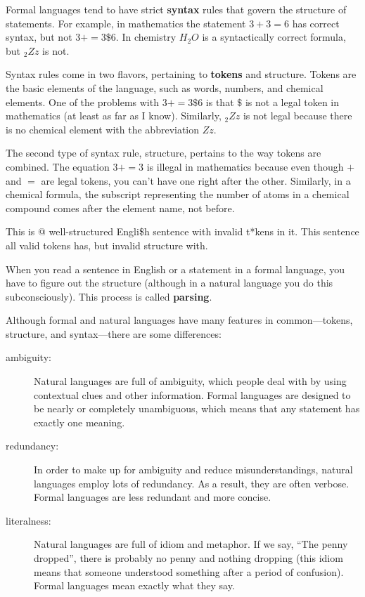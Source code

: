 Formal languages tend to have strict {\bf syntax} rules that
govern the structure of statements.
For example, in mathematics the statement
$3 + 3 = 6$ has correct syntax, but
not $3 + = 3 \$ 6$.  In chemistry
$H_2O$ is a syntactically correct formula, but $_2Zz$ is not.

Syntax rules come in two flavors, pertaining to {\bf tokens} and
structure.  Tokens are the basic elements of the language, such as
words, numbers, and chemical elements.  One of the problems with
$3 += 3 \$ 6$ is that \( \$ \) is not a legal token in mathematics
(at least as far as I know).  Similarly, $_2Zz$ is not legal because
there is no chemical element with the abbreviation $Zz$.

The second type of syntax rule, structure, pertains to the way tokens are
combined.  The equation $3 += 3$ is illegal in mathematics 
because even though $+$ and $=$ are legal tokens, you can't 
have one right after the other. Similarly, in a chemical formula, 
the subscript representing the number of atoms in a 
chemical compound comes after the element name, not before.

This is @ well-structured Engli\$h
sentence with invalid t*kens in it.  This sentence all valid 
tokens has, but invalid structure with.

When you read a sentence in English or a statement in a formal
language, you have to figure out the structure
(although in a natural language you do this subconsciously).  This
process is called {\bf parsing}.

Although formal and natural languages have many features in
common---tokens, structure, and syntax---there are some
differences:

\begin{description}

\item[ambiguity:] Natural languages are full of ambiguity, which
people deal with by using contextual clues and other information.
Formal languages are designed to be nearly or completely unambiguous,
which means that any statement has exactly one meaning. 

\item[redundancy:] In order to make up for ambiguity and reduce
misunderstandings, natural languages employ lots of
redundancy.  As a result, they are often verbose.  Formal languages
are less redundant and more concise.

\item[literalness:] Natural languages are full of idiom and metaphor.
If we say, ``The penny dropped'', there is probably no penny and
nothing dropping (this idiom means that someone understood something
after a period of confusion).  Formal languages
mean exactly what they say.

\end{description}

